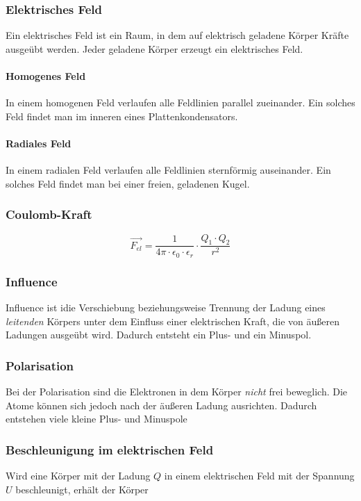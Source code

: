 \documentclass[a4paper]{article}
\begin{document}
			\subsubsection{Elektrisches Feld}\label{elektrisches_feld}
				Ein elektrisches Feld ist ein Raum, in dem auf elektrisch geladene Körper Kräfte ausgeübt werden. Jeder geladene Körper erzeugt ein elektrisches Feld.
		
				\paragraph{Homogenes Feld}
					In einem homogenen Feld verlaufen alle Feldlinien parallel zueinander. Ein solches Feld findet man im inneren eines Plattenkondensators.
					
				\paragraph{Radiales Feld}
					In einem radialen Feld verlaufen alle Feldlinien sternförmig auseinander. Ein solches Feld findet man bei einer freien, geladenen Kugel.
			
			\subsubsection{Coulomb-Kraft}
				\begin{equation}
					\vec{F_{el}}=\frac{1}{4\pi\cdot\epsilon_0\cdot\epsilon_r}\cdot\frac{Q_1\cdot Q_2}{r^2}
				\end{equation}
			
			\subsubsection{Influence}
				Influence ist idie Verschiebung beziehungsweise Trennung der Ladung eines \textit{leitenden} Körpers unter dem Einfluss einer elektrischen Kraft, die von äußeren Ladungen ausgeübt wird. Dadurch entsteht ein Plus- und ein Minuspol.
				
			\subsubsection{Polarisation}
				Bei der Polarisation sind die Elektronen in dem Körper \textit{nicht} frei beweglich. Die Atome können sich jedoch nach der äußeren Ladung ausrichten. Dadurch entstehen viele kleine Plus- und Minuspole
				
			\subsubsection{Beschleunigung im elektrischen Feld}
				Wird eine Körper mit der Ladung $Q$ in einem elektrischen Feld mit der Spannung $U$ beschleunigt, erhält der Körper
				
\end{document}
